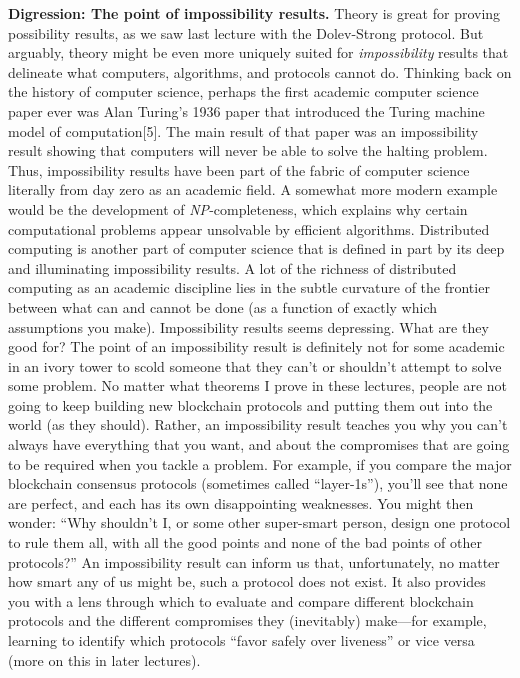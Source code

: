\textbf{Digression: The point of impossibility results.} Theory is great for proving possibility
results, as we saw last lecture with the Dolev-Strong protocol. But arguably, theory might be
even more uniquely suited for \textit{impossibility} results that delineate what computers, algorithms,
and protocols cannot do.
Thinking back on the history of computer science, perhaps the first academic computer
science paper ever was Alan Turing’s 1936 paper that introduced the Turing machine model
of computation[5]. The main result of that paper was an impossibility result showing that
computers will never be able to solve the halting problem. Thus,  impossibility results have
been part of the fabric of computer science literally from day zero as an academic field.
A somewhat more modern example would be the development of \textit{NP}-completeness, which
explains why certain computational problems appear unsolvable by efficient algorithms. Distributed computing is another part of computer science that is defined in part by its deep
and illuminating impossibility results. A lot of the richness of distributed computing as an
academic discipline lies in the subtle curvature of the frontier between what can and cannot
be done (as a function of exactly which assumptions you make).
Impossibility results seems depressing. What are they good for? The point of an impossibility result is definitely not for some academic in an ivory tower to scold someone that
they can’t or shouldn't attempt to solve some problem. No matter what theorems I prove in
these lectures, people are not going to keep building new blockchain protocols and putting
them out into the world (as they should). Rather, an impossibility result teaches you why
you can’t always have everything that you want, and about the compromises that are going
to be required when you tackle a problem.
For example, if you compare the major blockchain consensus protocols (sometimes called
“layer-1s”), you’ll see that none are perfect, and each has its own disappointing weaknesses.
You might then wonder: “Why shouldn't I, or some other super-smart person, design one
protocol to rule them all, with all the good points and none of the bad points of other
protocols?” An impossibility result can inform us that, unfortunately, no matter how smart any
of us might be, such a protocol does not exist. It also provides you with a lens through
which to evaluate and compare different blockchain protocols and the different compromises
they (inevitably) make—for example, learning to identify which protocols “favor safely over
liveness” or vice versa (more on this in later lectures).
